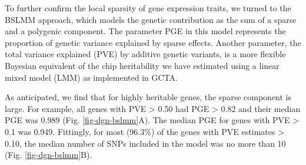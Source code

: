 \documentclass[10pt,letterpaper]{article}
\begin{document}
To further confirm the local sparsity of gene expression traits, we turned to the BSLMM \cite{Zhou_2013} approach, which models the genetic contribution as the sum of a sparse and a polygenic component. The parameter PGE in this model represents the proportion of genetic variance explained by sparse effects. Another parameter, the total variance explained (PVE) by additive genetic variants, is a more flexible Bayesian equivalent of the chip heritability we have estimated using a linear mixed model (LMM) as implemented in GCTA. 

As anticipated, we find that for highly heritable genes, the sparse component is large. For example, all genes with PVE \textgreater{} 0.50 had PGE \textgreater{} 0.82 and their median PGE was 0.989 (Fig. \ref{fig-dgn-bslmm}A). The median PGE for genes with PVE \textgreater{} 0.1 was 0.949. Fittingly, for most (96.3\%) of the genes with PVE estimates \textgreater{} 0.10, the median number of SNPs included in the model was no more than 10 (Fig. \ref{fig-dgn-bslmm}B).
\end{document}
